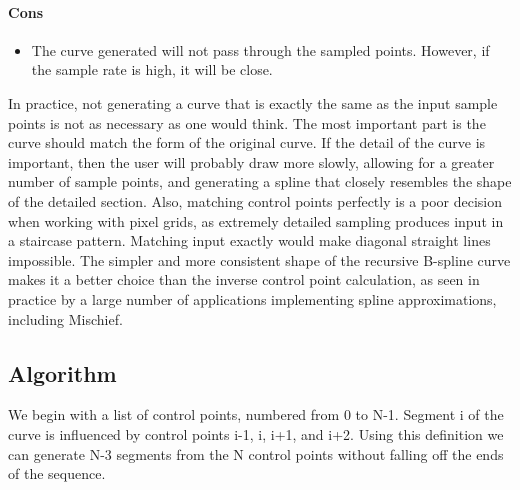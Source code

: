 \documentclass[12pt]{report}
\begin{document}
\paragraph{Cons}
\begin{itemize}
\item The curve generated will not pass through the sampled points. However, if the sample rate is high, it will be close.
\end{itemize}

In practice, not generating a curve that is exactly the same as the input sample points is not as necessary as one would think. 
The most important part is the curve should match the form of the original curve.
If the detail of the curve is important, then the user will probably draw more slowly, allowing for a greater number of sample points, and generating a spline that closely resembles the shape of the detailed section.
Also, matching control points perfectly is a poor decision when working with pixel grids, as extremely detailed sampling produces input in a staircase pattern.
Matching input exactly would make diagonal straight lines impossible.
The simpler and more consistent shape of the recursive B-spline curve makes it a better choice than the inverse control point calculation, as seen in practice by a large number of applications implementing spline approximations, including Mischief.

\subsection{Algorithm}

We begin with a list of control points, numbered from 0 to N-1. 
Segment i of the curve is influenced by control points i-1, i, i+1, and i+2.
Using this definition we can generate N-3 segments from the N control points without falling off the ends of the sequence.
\end{document}
